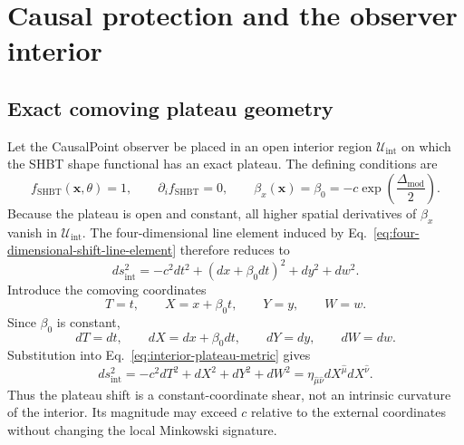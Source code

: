 \section{Causal protection and the observer interior}\label{sec:causal-protection}

\subsection{Exact comoving plateau geometry}

Let the CausalPoint observer be placed in an open interior region
\(\mathcal U_{\mathrm{int}}\) on which the SHBT shape functional has an exact
plateau.  The defining conditions are
\begin{equation}
  f_{\mathrm{SHBT}}(\boldsymbol{x},\theta)
  =
  1,
  \qquad
  \partial_i f_{\mathrm{SHBT}}
  =
  0,
  \qquad
  \beta_x(\boldsymbol{x})
  =
  \beta_0
  =
  -c
  \exp\left(
    \frac{\Delta_{\mathrm{mod}}}{2}
  \right).
  \label{eq:exact-interior-plateau}
\end{equation}
Because the plateau is open and constant, all higher spatial derivatives of
\(\beta_x\) vanish in \(\mathcal U_{\mathrm{int}}\).  The four-dimensional
line element induced by Eq.~\eqref{eq:four-dimensional-shift-line-element}
therefore reduces to
\begin{equation}
  ds_{\mathrm{int}}^2
  =
  -c^2dt^2
  +
  \left(
    dx+\beta_0dt
  \right)^2
  +
  dy^2
  +
  dw^2.
  \label{eq:interior-plateau-metric}
\end{equation}
Introduce the comoving coordinates
\begin{equation}
  T=t,
  \qquad
  X=x+\beta_0t,
  \qquad
  Y=y,
  \qquad
  W=w.
  \label{eq:interior-coordinate-transformation}
\end{equation}
Since \(\beta_0\) is constant,
\begin{equation}
  dT=dt,
  \qquad
  dX=dx+\beta_0dt,
  \qquad
  dY=dy,
  \qquad
  dW=dw.
  \label{eq:interior-coordinate-differentials}
\end{equation}
Substitution into Eq.~\eqref{eq:interior-plateau-metric} gives
\begin{equation}
  ds_{\mathrm{int}}^2
  =
  -c^2dT^2
  +
  dX^2
  +
  dY^2
  +
  dW^2
  =
  \eta_{\hat\mu\hat\nu}
  dX^{\hat\mu}dX^{\hat\nu}.
  \label{eq:exact-interior-minkowski}
\end{equation}
Thus the plateau shift is a constant-coordinate shear, not an intrinsic
curvature of the interior.  Its magnitude may exceed \(c\) relative to the
external coordinates without changing the local Minkowski signature.

